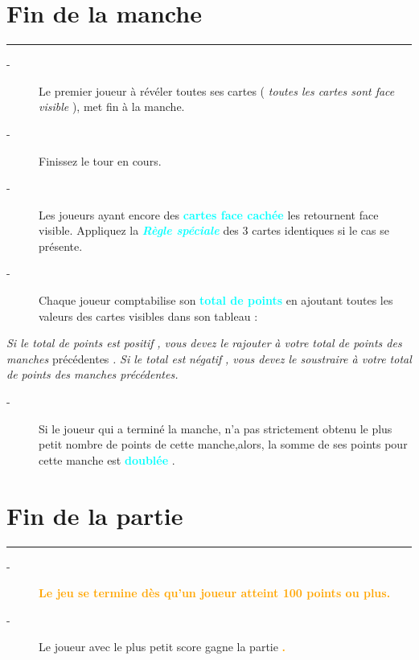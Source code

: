 \documentclass{article}%
\begin{document}
%
\sectionfont{\color{cyan}}%
\subsectionfont{\color{cyan}}%
\subsubsectionfont{\color{cyan}}%
\section{ Fin de la manche
}%
\label{sec:Findelamanche}%
\textcolor{cyan}{\rule{18cm}{0.07cm}}\break%
\begin{description}%
\item[{-} ]%
%
Le premier joueur à révéler toutes ses cartes (%
\textit{toutes les cartes sont face visible}%
), met fin à la manche.
%
\item[{-} ]%
%
 Finissez le tour en cours.
%
\item[{-} ]%
%
 Les joueurs ayant encore des %
\textcolor{cyan}{%
\textbf{cartes face cachée}%
}%
\textit{ }%
 les retournent face visible. Appliquez la %
\textcolor{cyan}{\textbf{\textit{Règle spéciale}}}%
\textit{ }%
 des 3 cartes identiques si le cas se présente.
%
\item[{-} ]%
%
 Chaque joueur comptabilise son %
\textcolor{cyan}{%
\textbf{total de points}%
}%
\textit{ }%
 en ajoutant toutes les valeurs des cartes visibles dans son tableau :
%
\end{description}%
\textit{Si le total de points est }%
\textit{positif}%
\textit{, vous devez le }%
\textit{rajouter}%
\textit{ à votre total de points des manches }%
précédentes%
\textit{.
}%
\textit{ Si le total est }%
\textit{négatif}%
\textit{, vous devez le soustraire à votre total de points des manches précédentes.
}%
\begin{description}%
\item[{-} ]%
%
Si le joueur qui a terminé la manche, n’a pas strictement obtenu le plus petit nombre de points de cette manche,alors, la somme de ses points pour cette manche est %
\textcolor{cyan}{%
\textbf{doublée}%
}%
.
%
\end{description}

%
\sectionfont{\color{orange}}%
\subsectionfont{\color{orange}}%
\subsubsectionfont{\color{orange}}%
\section{ Fin de la partie
}%
\label{sec:Findelapartie}%
\textcolor{orange}{\rule{18cm}{0.07cm}}\break%
\begin{description}%
\item[{-} ]%
%
\textcolor{orange}{%
\textbf{Le jeu se termine dès qu’un joueur atteint 100 points ou plus.
}%
}%
\item[{-} ]%
%
 Le joueur avec le plus petit score gagne la partie%
\textcolor{orange}{%
\textbf{.}%
}%
\end{description}

%
\end{document}
